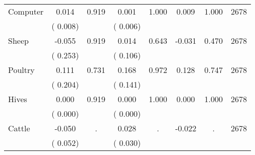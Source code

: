 \begin{tabular}{l*{7}{c}}
 Computer       &              0.014       &        0.919  &              0.001       &        1.000  &              0.009       &              1.000 &  2678 \\ 
                       &       (       0.008)             &                               &       (       0.006)                     &                               &                                               &                                &                      \\ 

 Sheep       &             -0.055       &        0.919  &              0.014       &        0.643  &             -0.031       &              0.470 &  2678 \\ 
                       &       (       0.253)             &                               &       (       0.106)                     &                               &                                               &                                &                      \\ 

 Poultry       &              0.111       &        0.731  &              0.168       &        0.972  &              0.128       &              0.747 &  2678 \\ 
                       &       (       0.204)             &                               &       (       0.141)                     &                               &                                               &                                &                      \\ 

 Hives       &              0.000       &        0.919  &              0.000       &        1.000  &              0.000       &              1.000 &  2678 \\ 
                       &       (       0.000)             &                               &       (       0.000)                     &                               &                                               &                                &                      \\ 

 Cattle       &             -0.050       &            .  &              0.028       &            .  &             -0.022       &                  . &  2678 \\ 
                       &       (       0.052)             &                               &       (       0.030)                     &                               &                                               &                                &                      \\ 


\end{tabular}
